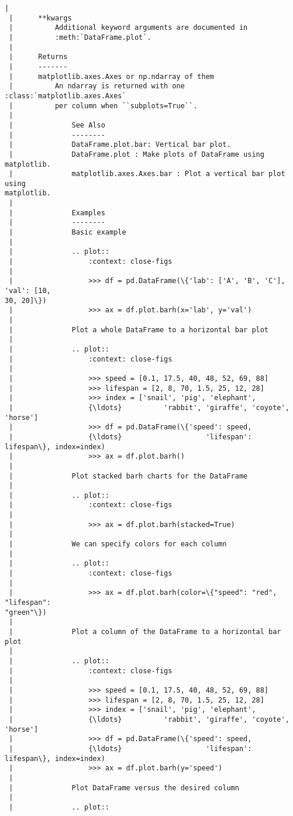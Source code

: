 \documentclass[11pt]{article}
\begin{document}
\begin{Verbatim}[commandchars=\\\{\}]
 |
 |      **kwargs
 |          Additional keyword arguments are documented in
 |          :meth:`DataFrame.plot`.
 |
 |      Returns
 |      -------
 |      matplotlib.axes.Axes or np.ndarray of them
 |          An ndarray is returned with one :class:`matplotlib.axes.Axes`
 |          per column when ``subplots=True``.
 |
 |              See Also
 |              --------
 |              DataFrame.plot.bar: Vertical bar plot.
 |              DataFrame.plot : Make plots of DataFrame using matplotlib.
 |              matplotlib.axes.Axes.bar : Plot a vertical bar plot using
matplotlib.
 |
 |              Examples
 |              --------
 |              Basic example
 |
 |              .. plot::
 |                  :context: close-figs
 |
 |                  >>> df = pd.DataFrame(\{'lab': ['A', 'B', 'C'], 'val': [10,
30, 20]\})
 |                  >>> ax = df.plot.barh(x='lab', y='val')
 |
 |              Plot a whole DataFrame to a horizontal bar plot
 |
 |              .. plot::
 |                  :context: close-figs
 |
 |                  >>> speed = [0.1, 17.5, 40, 48, 52, 69, 88]
 |                  >>> lifespan = [2, 8, 70, 1.5, 25, 12, 28]
 |                  >>> index = ['snail', 'pig', 'elephant',
 |                  {\ldots}          'rabbit', 'giraffe', 'coyote', 'horse']
 |                  >>> df = pd.DataFrame(\{'speed': speed,
 |                  {\ldots}                    'lifespan': lifespan\}, index=index)
 |                  >>> ax = df.plot.barh()
 |
 |              Plot stacked barh charts for the DataFrame
 |
 |              .. plot::
 |                  :context: close-figs
 |
 |                  >>> ax = df.plot.barh(stacked=True)
 |
 |              We can specify colors for each column
 |
 |              .. plot::
 |                  :context: close-figs
 |
 |                  >>> ax = df.plot.barh(color=\{"speed": "red", "lifespan":
"green"\})
 |
 |              Plot a column of the DataFrame to a horizontal bar plot
 |
 |              .. plot::
 |                  :context: close-figs
 |
 |                  >>> speed = [0.1, 17.5, 40, 48, 52, 69, 88]
 |                  >>> lifespan = [2, 8, 70, 1.5, 25, 12, 28]
 |                  >>> index = ['snail', 'pig', 'elephant',
 |                  {\ldots}          'rabbit', 'giraffe', 'coyote', 'horse']
 |                  >>> df = pd.DataFrame(\{'speed': speed,
 |                  {\ldots}                    'lifespan': lifespan\}, index=index)
 |                  >>> ax = df.plot.barh(y='speed')
 |
 |              Plot DataFrame versus the desired column
 |
 |              .. plot::

\end{Verbatim}
\end{document}
